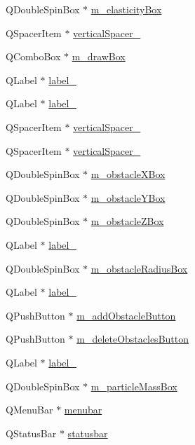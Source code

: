 \begin{DoxyCompactItemize}
\item 
QDoubleSpinBox $\ast$ \hyperlink{classUi__MainWindow_adeba4ba7f56681d9962322bb7c8e33f5}{m\_\-elasticityBox}
\item 
QSpacerItem $\ast$ \hyperlink{classUi__MainWindow_ac845bdf6b5b5237378a7b067808b7a31}{verticalSpacer\_}
\item 
QComboBox $\ast$ \hyperlink{classUi__MainWindow_aed4f32d456ab04871cd8d062baec1480}{m\_\-drawBox}
\item 
QLabel $\ast$ \hyperlink{classUi__MainWindow_ab6ac4329a89041f557332f6569d94493}{label\_}
\item 
QLabel $\ast$ \hyperlink{classUi__MainWindow_a1c16c0a684617927472e534822a63c7d}{label\_}
\item 
QSpacerItem $\ast$ \hyperlink{classUi__MainWindow_adc1f5fdd97fb3729999c56902d0fa591}{verticalSpacer\_}
\item 
QSpacerItem $\ast$ \hyperlink{classUi__MainWindow_a298e82ba0cc2500cd61f393f493e4529}{verticalSpacer\_}
\item 
QDoubleSpinBox $\ast$ \hyperlink{classUi__MainWindow_af5fb606a15c63b78d99ef08ffef44bb2}{m\_\-obstacleXBox}
\item 
QDoubleSpinBox $\ast$ \hyperlink{classUi__MainWindow_a91bc8c3fc0d20b7c8bafd4e305d3dbc1}{m\_\-obstacleYBox}
\item 
QDoubleSpinBox $\ast$ \hyperlink{classUi__MainWindow_a63b4ccd5fefd7242fde139d0ced35e24}{m\_\-obstacleZBox}
\item 
QLabel $\ast$ \hyperlink{classUi__MainWindow_a1f4ff90c122fededcc08604401442034}{label\_}
\item 
QDoubleSpinBox $\ast$ \hyperlink{classUi__MainWindow_a683f5df015306268c5135243a234a0ca}{m\_\-obstacleRadiusBox}
\item 
QLabel $\ast$ \hyperlink{classUi__MainWindow_a55100f53189f25cf8a1ee0beb29be642}{label\_}
\item 
QPushButton $\ast$ \hyperlink{classUi__MainWindow_acec2335350b2a00960d8f6dc7a59a2a4}{m\_\-addObstacleButton}
\item 
QPushButton $\ast$ \hyperlink{classUi__MainWindow_ad1aa984f30af3df4d2727e31f38648fa}{m\_\-deleteObstaclesButton}
\item 
QLabel $\ast$ \hyperlink{classUi__MainWindow_a13936e6f18b1c90402b3c7a3c92b6cdb}{label\_}
\item 
QDoubleSpinBox $\ast$ \hyperlink{classUi__MainWindow_a7e35e693ba29d63bbcd1d01556282798}{m\_\-particleMassBox}
\item 
QMenuBar $\ast$ \hyperlink{classUi__MainWindow_adf43d9a67adaec750aaa956b5e082f09}{menubar}
\item 
QStatusBar $\ast$ \hyperlink{classUi__MainWindow_a1687cceb1e2787aa1f83e50433943a91}{statusbar}
\end{DoxyCompactItemize}


